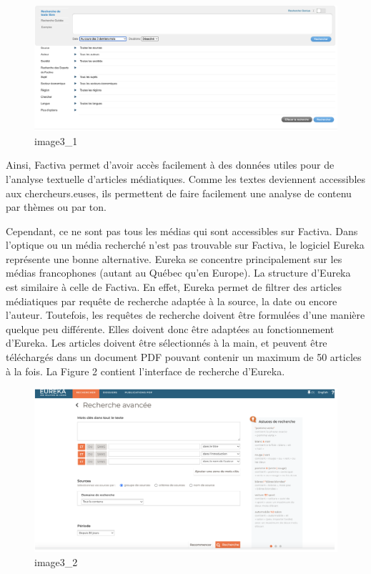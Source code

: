 \documentclass[
  letterpaper,
]{scrbook}
\begin{document}
\begin{figure}

{\centering \includegraphics{images/chapitre3_factiva.png}

}

\caption{image3\_1}

\end{figure}

Ainsi, Factiva permet d'avoir accès facilement à des données utiles pour
de l'analyse textuelle d'articles médiatiques. Comme les textes
deviennent accessibles aux chercheurs.euses, ils permettent de faire
facilement une analyse de contenu par thèmes ou par ton.

Cependant, ce ne sont pas tous les médias qui sont accessibles sur
Factiva. Dans l'optique ou un média recherché n'est pas trouvable sur
Factiva, le logiciel Eureka représente une bonne alternative. Eureka se
concentre principalement sur les médias francophones (autant au Québec
qu'en Europe). La structure d'Eureka est similaire à celle de Factiva.
En effet, Eureka permet de filtrer des articles médiatiques par requête
de recherche adaptée à la source, la date ou encore l'auteur. Toutefois,
les requêtes de recherche doivent être formulées d'une manière quelque
peu différente. Elles doivent donc être adaptées au fonctionnement
d'Eureka. Les articles doivent être sélectionnés à la main, et peuvent
être téléchargés dans un document PDF pouvant contenir un maximum de 50
articles à la fois. La Figure 2 contient l'interface de recherche
d'Eureka.

\begin{figure}

{\centering \includegraphics{images/chapitre3_eureka.png}

}

\caption{image3\_2}

\end{figure}
\end{document}
